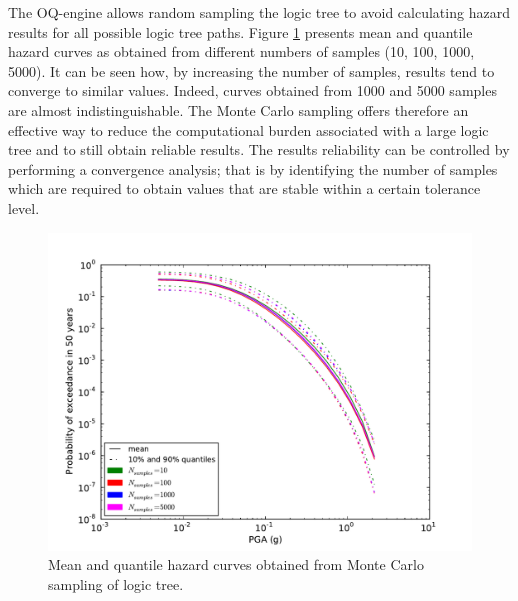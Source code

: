 The OQ-engine allows random sampling the logic tree to avoid calculating hazard
results for all possible logic tree paths. Figure \ref{fig:logic_tree_curves}
presents mean and quantile hazard curves as obtained from different numbers of
samples (10, 100, 1000, 5000). It can be seen how, by increasing the number of
samples, results tend to converge to similar values. Indeed, curves obtained
from 1000 and 5000 samples are almost indistinguishable. The Monte Carlo
sampling offers therefore an effective way to reduce the computational burden
associated with a large logic tree and to still obtain reliable results. The
results reliability can be controlled by performing a convergence analysis; that
is by identifying the number of samples which are required to obtain values that
are stable within a certain tolerance level.
\begin{figure}
\centering
\includegraphics[width=14cm]{./Pictures/LogicTreeCurves.pdf}
\caption{Mean and quantile hazard curves obtained from Monte Carlo sampling of logic tree.}
\label{fig:logic_tree_curves}
\end{figure}
%
